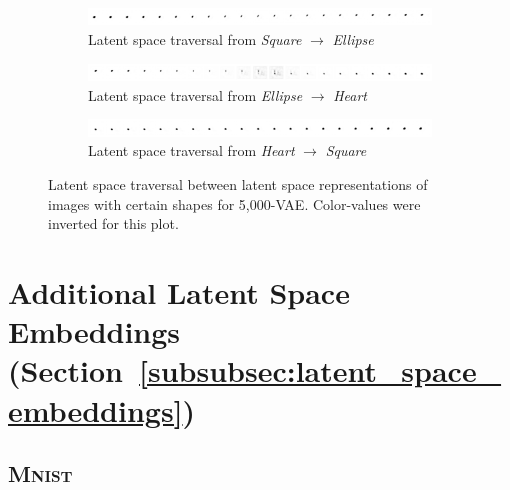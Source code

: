 \documentclass[11pt]{article}
\let\oldsection\section
\renewcommand\section{\clearpage\oldsection}
\begin{document}
\begin{figure}[H]
\centering
\begin{subfigure}{\textwidth}
\centering
\includegraphics[width=\textwidth]{images/latent_space_entanglement/vae_5000_traverse_square_ellipse.png}
\caption{Latent space traversal from \textit{Square} $\rightarrow$ \textit{Ellipse}}
\end{subfigure}
\begin{subfigure}{\textwidth}
\centering
\includegraphics[width=\textwidth]{images/latent_space_entanglement/vae_5000_traverse_ellipse_heart.png}
\caption{Latent space traversal from \textit{Ellipse} $\rightarrow$ \textit{Heart}}
\end{subfigure}
\begin{subfigure}{\textwidth}
\centering
\includegraphics[width=\textwidth]{images/latent_space_entanglement/vae_5000_traverse_heart_square.png}
\caption{Latent space traversal from \textit{Heart} $\rightarrow$ \textit{Square}}
\label{subfig:10000_vae_latent_space_traversal_heart_to_square}
\end{subfigure}
\caption[5,000-\ac{VAE} - Latent Space Traversal]{Latent space traversal between latent space representations of images with certain shapes for 5,000-\ac{VAE}. Color-values were inverted for this plot.}
\label{fig:5000_vae_latent_space_traversal_shape_to_shape}
\end{figure}


\pagebreak
\section{Additional Latent Space Embeddings (Section~\ref{subsubsec:latent_space_embeddings})}

\subsection{\textsc{Mnist}}
\end{document}

